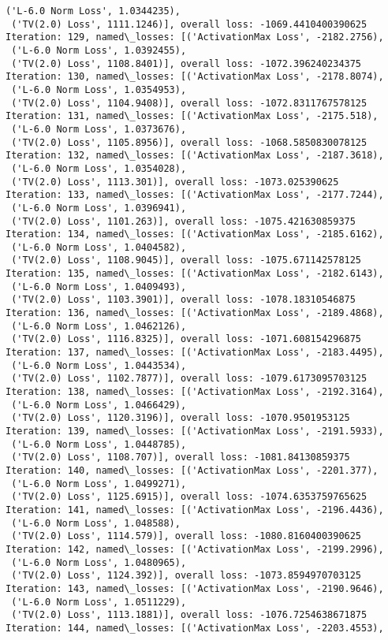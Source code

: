 \documentclass[10pt]{article}
\begin{document}
\begin{Verbatim}[commandchars=\\\{\}]
 ('L-6.0 Norm Loss', 1.0344235),
 ('TV(2.0) Loss', 1111.1246)], overall loss: -1069.4410400390625
Iteration: 129, named\_losses: [('ActivationMax Loss', -2182.2756),
 ('L-6.0 Norm Loss', 1.0392455),
 ('TV(2.0) Loss', 1108.8401)], overall loss: -1072.396240234375
Iteration: 130, named\_losses: [('ActivationMax Loss', -2178.8074),
 ('L-6.0 Norm Loss', 1.0354953),
 ('TV(2.0) Loss', 1104.9408)], overall loss: -1072.8311767578125
Iteration: 131, named\_losses: [('ActivationMax Loss', -2175.518),
 ('L-6.0 Norm Loss', 1.0373676),
 ('TV(2.0) Loss', 1105.8956)], overall loss: -1068.5850830078125
Iteration: 132, named\_losses: [('ActivationMax Loss', -2187.3618),
 ('L-6.0 Norm Loss', 1.0354028),
 ('TV(2.0) Loss', 1113.301)], overall loss: -1073.025390625
Iteration: 133, named\_losses: [('ActivationMax Loss', -2177.7244),
 ('L-6.0 Norm Loss', 1.0396941),
 ('TV(2.0) Loss', 1101.263)], overall loss: -1075.421630859375
Iteration: 134, named\_losses: [('ActivationMax Loss', -2185.6162),
 ('L-6.0 Norm Loss', 1.0404582),
 ('TV(2.0) Loss', 1108.9045)], overall loss: -1075.671142578125
Iteration: 135, named\_losses: [('ActivationMax Loss', -2182.6143),
 ('L-6.0 Norm Loss', 1.0409493),
 ('TV(2.0) Loss', 1103.3901)], overall loss: -1078.18310546875
Iteration: 136, named\_losses: [('ActivationMax Loss', -2189.4868),
 ('L-6.0 Norm Loss', 1.0462126),
 ('TV(2.0) Loss', 1116.8325)], overall loss: -1071.608154296875
Iteration: 137, named\_losses: [('ActivationMax Loss', -2183.4495),
 ('L-6.0 Norm Loss', 1.0443534),
 ('TV(2.0) Loss', 1102.7877)], overall loss: -1079.6173095703125
Iteration: 138, named\_losses: [('ActivationMax Loss', -2192.3164),
 ('L-6.0 Norm Loss', 1.0466429),
 ('TV(2.0) Loss', 1120.3196)], overall loss: -1070.9501953125
Iteration: 139, named\_losses: [('ActivationMax Loss', -2191.5933),
 ('L-6.0 Norm Loss', 1.0448785),
 ('TV(2.0) Loss', 1108.707)], overall loss: -1081.84130859375
Iteration: 140, named\_losses: [('ActivationMax Loss', -2201.377),
 ('L-6.0 Norm Loss', 1.0499271),
 ('TV(2.0) Loss', 1125.6915)], overall loss: -1074.6353759765625
Iteration: 141, named\_losses: [('ActivationMax Loss', -2196.4436),
 ('L-6.0 Norm Loss', 1.048588),
 ('TV(2.0) Loss', 1114.579)], overall loss: -1080.8160400390625
Iteration: 142, named\_losses: [('ActivationMax Loss', -2199.2996),
 ('L-6.0 Norm Loss', 1.0480965),
 ('TV(2.0) Loss', 1124.392)], overall loss: -1073.8594970703125
Iteration: 143, named\_losses: [('ActivationMax Loss', -2190.9646),
 ('L-6.0 Norm Loss', 1.0511229),
 ('TV(2.0) Loss', 1113.1881)], overall loss: -1076.7254638671875
Iteration: 144, named\_losses: [('ActivationMax Loss', -2203.4553),

\end{Verbatim}
\end{document}
